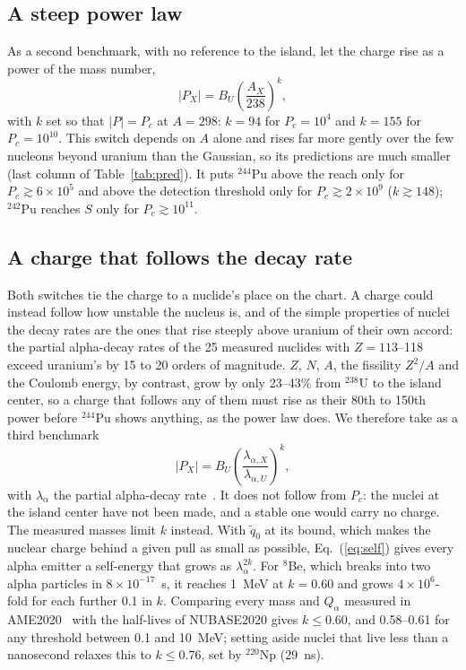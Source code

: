 \documentclass[aps,prd,onecolumn,superscriptaddress,floatfix,nofootinbib]{revtex4-2}
\newcommand{\qt}{\tilde q}
\newcommand{\Pu}[1]{$^{#1}$Pu}
\newcommand{\nuc}[2]{$^{#1}$#2}
\begin{document}
\FloatBarrier

\subsection{A steep power law}

As a second benchmark, with no reference to the island, let the charge rise as a power of the mass number,
\begin{equation}
|P_X| = B_U\left(\frac{A_X}{238}\right)^{k},
\label{eq:power}
\end{equation}
with $k$ set so that $|P|=P_c$ at $A=298$: $k=94$ for $P_c=10^{4}$ and $k=155$ for $P_c=10^{10}$. This switch depends
on $A$ alone and rises far more gently over the few nucleons beyond uranium than the Gaussian, so its predictions are
much smaller (last column of Table~\ref{tab:pred}). It puts \Pu{244} above the reach only for
$P_c\gtrsim6\times10^{5}$ and above the detection threshold only for $P_c\gtrsim2\times10^{9}$ ($k\gtrsim148$);
\Pu{242} reaches $S$ only for $P_c\gtrsim10^{11}$.

\subsection{A charge that follows the decay rate}\label{sec:decay}

Both switches tie the charge to a nuclide's place on the chart. A charge could instead follow how unstable the
nucleus is, and of the simple properties of nuclei the decay rates are the ones that rise steeply above uranium of
their own accord: the partial alpha-decay rates of the 25 measured nuclides with $Z=113$--118 exceed uranium's by 15
to 20 orders of magnitude. $Z$, $N$, $A$, the fissility $Z^2/A$ and the Coulomb energy, by contrast, grow by only
23--43\% from \nuc{238}{U} to the island center, so a charge that follows any of them must rise as their 80th to
150th power before \Pu{244} shows anything, as the power law does. We therefore take as a third benchmark
\begin{equation}
|P_X| = B_U\left(\frac{\lambda_{\alpha,X}}{\lambda_{\alpha,U}}\right)^{k},
\label{eq:decay}
\end{equation}
with $\lambda_\alpha$ the partial alpha-decay rate~\cite{Kondev2021}. It does not follow from $P_c$: the nuclei at the
island center have not been made, and a stable one would carry no charge. The measured masses limit $k$ instead.
With $\qt_0$ at its bound, which makes the nuclear charge behind a given pull as small as possible,
Eq.~(\ref{eq:self}) gives every alpha emitter a self-energy that grows as $\lambda_\alpha^{2k}$. For \nuc{8}{Be},
which breaks into two alpha particles in $8\times10^{-17}$~s, it reaches 1~MeV at $k=0.60$ and grows
$4\times10^{6}$-fold for each further 0.1 in $k$. Comparing every mass and $Q_\alpha$ measured in
AME2020~\cite{Wang2021} with the half-lives of NUBASE2020 gives $k\le0.60$, and 0.58--0.61 for any threshold between
0.1 and 10~MeV; setting aside nuclei that live less than a nanosecond relaxes this to $k\le0.76$, set by
\nuc{220}{Np} (29~ns).
\end{document}
